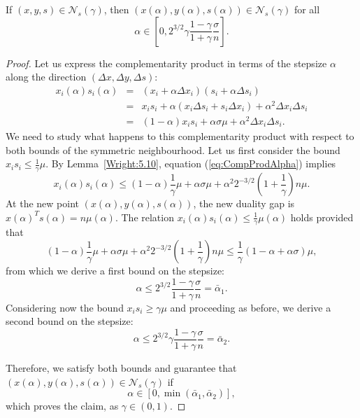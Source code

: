 \begin{theorem} \label{th:SymNeighbourhood}
  If $(x,y,s)\in\mathcal{N}_s(\gamma)$, then 
  $\left(x(\alpha),y(\alpha),s(\alpha)\right)\in\mathcal{N}_s(\gamma)$ for all
  \[
  \alpha\in \left[0,2^{3/2}\gamma\frac{1-\gamma}{1+\gamma}\frac{\sigma}{n} \right].
  \]
\end{theorem}
\begin{proof}
Let us express the complementarity product in terms of the stepsize 
$\alpha$ along the direction $(\Delta x, \Delta y, \Delta s)$:
%
\begin{eqnarray} \label{eq:CompProdAlpha}
x_i(\alpha)s_i(\alpha)&=&(x_i+\alpha\Delta x_i)(s_i+\alpha\Delta s_i)\nonumber\\ 
&=& x_is_i+\alpha(x_i\Delta s_i +s_i\Delta x_i) +\alpha^2\Delta x_i\Delta s_i\\
&=& (1-\alpha)x_is_i + \alpha\sigma\mu + \alpha^2\Delta x_i\Delta s_i.\nonumber
\end{eqnarray}
%
We need to study what happens to this complementarity product 
with respect to both bounds of the symmetric neighbourhood.
%
Let us first consider the bound $x_is_i\le \frac{1}{\gamma}\mu$.
By Lemma~\ref{Wright:5.10}, equation (\ref{eq:CompProdAlpha}) implies
\[
x_i(\alpha)s_i(\alpha) \le (1-\alpha)\frac{1}{\gamma}\mu +\alpha\sigma\mu 
+ \alpha^2 2^{-3/2}\left( 1+ \frac{1}{\gamma} \right)n\mu.
\]
At the new point $(x(\alpha),y(\alpha),s(\alpha))$, the new duality gap
is $x(\alpha)^Ts(\alpha) = n\mu(\alpha)$.
The relation $x_i(\alpha)s_i(\alpha)\le \frac{1}{\gamma}\mu(\alpha)$ 
holds provided that
\[
(1-\alpha)\frac{1}{\gamma}\mu +\alpha\sigma\mu + \alpha^2 2^{-3/2}\left( 1+ \frac{1}{\gamma} \right)n\mu 
\le\frac{1}{\gamma}(1-\alpha+\alpha\sigma)\mu,
\]
from which we derive a first bound on the stepsize:
\[
\alpha \le 2^{3/2}\frac{1-\gamma}{1+\gamma}\frac{\sigma}{n} = \bar\alpha_1.
\]
%
Considering now the bound $x_is_i\ge \gamma\mu$ and proceeding as before,
we derive a second bound on the stepsize:
\[
\alpha\le 2^{3/2}\gamma\frac{1-\gamma}{1+\gamma}\frac{\sigma}{n} =\bar\alpha_2.
\]

Therefore, we satisfy both bounds and guarantee that 
$(x(\alpha),y(\alpha),s(\alpha))\in \mathcal{N}_s(\gamma)$ if
\[
\alpha \in [0,\min(\bar\alpha_1,\bar\alpha_2)],
\]
which proves the claim, as $\gamma \in (0,1)$.
\end{proof}

